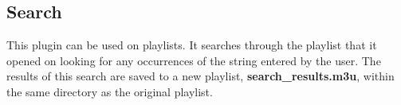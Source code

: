 \subsection{Search}
This plugin can be used on playlists.  It searches through the playlist
that it opened on looking for any occurrences of the string entered by the
user.  The results of this search are saved to a new playlist,
\textbf{search\_results.m3u}, within the same directory as the
original playlist.

